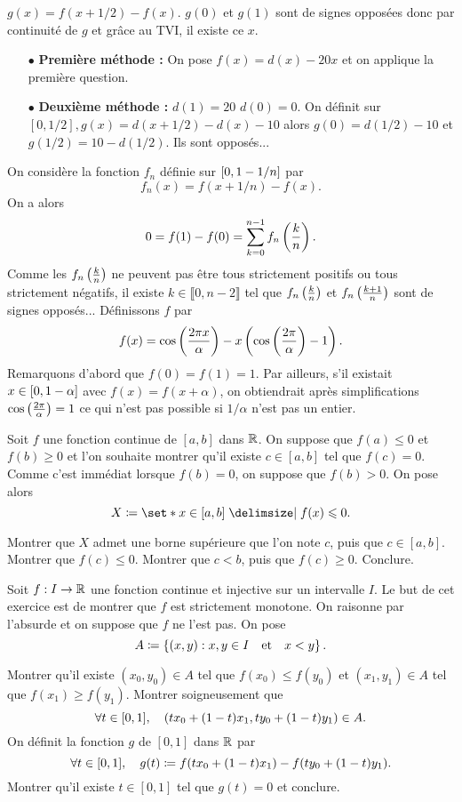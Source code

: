 \documentclass{magnolia}
\begin{document}
\begin{sol}
\begin{questions}
\question $g(x)=f(x+1/2)-f(x)$. $g(0)$ et $g(1)$ sont de signes opposées donc par continuité de $g$ et grâce au TVI, il existe ce $x$.
\question 
\begin{itemize}
\item[$\bullet$] \textbf{Première méthode :} On pose $f(x)=d(x)-20x$ et on applique la première question. 
\item[$\bullet$] \textbf{Deuxième méthode :}  $d(1)=20$ $d(0)=0$. On définit sur $[0,1/2], g(x)=d(x+1/2)-d(x)-10$ alors $g(0)=d(1/2)-10$ et $g(1/2)=10-d(1/2)$. Ils sont opposés...  
\end{itemize}
\question On considère la fonction $f_n$ définie sur $\left[0,1-1/n\right]$ par $$f_n(x)=f(x+1/n)-f(x).$$ On a alors $$0=f(1)-f(0)=\sum_{k=0}^{n-1}f_n\left(\frac{k}{n}\right).$$ Comme les $f_n\left(\frac{k}{n}\right)$ ne peuvent pas être tous strictement positifs ou tous strictement négatifs, il existe $k\in \llbracket 0, n-2\rrbracket$ tel que $f_n\left(\frac{k}{n}\right)$ et $f_n\left(\frac{k+1}{n}\right)$ sont de signes opposés...
\question Définissons $f$ par $$f(x)=\cos\left(\frac{2\pi x}{\alpha}\right)-x\left(\cos\left(\frac{2\pi}{\alpha}\right)-1\right).$$
Remarquons d'abord que $f(0)=f(1)=1$. Par ailleurs, s'il existait $x\in \left[0,1-\alpha\right]$ avec $f(x)=f(x+\alpha)$, on obtiendrait après simplifications $\cos\left(\frac{2\pi}{\alpha}\right)=1$ ce qui n'est pas possible si $1/\alpha$ n'est pas un entier.
\end{questions}
\end{sol}


Soit $f$ une fonction continue de $[a,b]$ dans $\mathbb{R}$. On suppose que $f(a)\leq 0$ et
$f(b)\geq 0$ et l'on souhaite montrer qu'il existe $c\in[a,b]$ tel que $f(c)=0$.
Comme c'est immédiat lorsque $f(b)=0$, on suppose que $f(b)>0$. On pose alors
\[X\defeq\enstq{x\in[a,b]}{f(x)\leq 0}.\]
\begin{questions}
\question Montrer que $X$ admet une borne supérieure que l'on note $c$, puis que
  $c\in[a,b]$.
\question Montrer que $f(c)\leq 0$.
\question Montrer que $c<b$, puis que $f(c)\geq 0$. Conclure.
\end{questions}

Soit $f:I\to\mathbb{R}$ une fonction continue et injective sur un intervalle $I$. Le but de cet
exercice est de montrer que $f$ est strictement monotone. On raisonne par l'absurde et
on suppose que $f$ ne l'est pas. On pose
\[A\coloneqq\left\{(x,y) : x,y\in I \quad\text{et}\quad x < y\right\}.\]
\begin{questions}
\question Montrer qu'il existe $(x_0,y_0)\in A$ tel que $f(x_0)\leq f(y_0)$ et
  $(x_1,y_1)\in A$ tel que $f(x_1)\geq f(y_1)$.
\question Montrer soigneusement que
  \[\forall t\in[0,1],\quad (t x_0+(1-t)x_1,t y_0+(1-t)y_1)\in A.\]
\question On définit la fonction $g$ de $[0,1]$ dans $\mathbb{R}$ par
  \[\forall  t\in[0,1],\quad g(t)\coloneqq f(t x_0 +(1-t)x_1)-f(t y_0+(1-t)y_1).\]
  Montrer qu'il existe $t\in[0,1]$ tel que $g(t)=0$ et conclure.
\end{questions}
\end{document}

